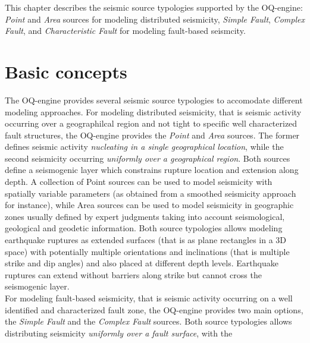 This chapter describes the seismic source typologies supported by the OQ-engine: \textit{Point} and
\textit{Area} sources for modeling distributed seismicity, \textit{Simple Fault}, \textit{Complex Fault}, and
\textit{Characteristic Fault} for modeling fault-based seismcity.


\section{Basic concepts}
The OQ-engine provides several seismic source typologies to accomodate different modeling approaches. For modeling distributed seismicity, that is seismic activity occurring over a geographilcal region and not tight to
specific well characterized fault structures, the OQ-engine provides the \textit{Point} and \textit{Area} sources. The former defines seismic activity \textit{nucleating in a single geographical location}, while the second seismicity occurring \textit{uniformly over a geographical region}. Both sources define a seismogenic layer which constrains rupture location and extension along depth. A collection of Point sources can be used to model seismicity with spatially variable parameters (as obtained from a smoothed seismicity approach for instance), while Area sources can be used to model seismicity in geographic zones usually defined by expert judgments taking into account seismological, geological and geodetic information. Both source typologies
allows modeling earthquake ruptures as extended surfaces (that is as plane rectangles in a 3D space) with potentially multiple orientations and inclinations (that is multiple strike and dip angles) and also placed
at different depth levels. Earthquake ruptures can extend without barriers along strike but cannot cross the seismogenic layer.\\
For modeling fault-based seismicity, that is seismic activity occurring on a well identified and characterized
fault zone, the OQ-engine provides two main options, the \textit{Simple Fault} and the \textit{Complex Fault}
sources. Both source typologies allows distributing seismicity \textit{uniformly over a fault surface}, with the
